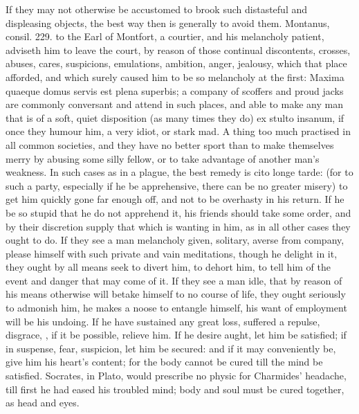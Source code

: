 {If they may not otherwise be accustomed to brook such distasteful and
displeasing objects, the best way then is generally to avoid them.
Montanus, consil. 229. to the Earl of Montfort, a courtier, and his
melancholy patient, adviseth him to leave the court, by reason of those
continual discontents, crosses, abuses, cares, suspicions,
emulations, ambition, anger, jealousy, which that place afforded, and
which surely caused him to be so melancholy at the first: Maxima
quaeque domus servis est plena superbis; a company of scoffers and
proud jacks are commonly conversant and attend in such places, and able
to make any man that is of a soft, quiet disposition (as many times
they do) ex stulto insanum, if once they humour him, a very idiot, or
stark mad. A thing too much practised in all common societies, and they
have no better sport than to make themselves merry by abusing some
silly fellow, or to take advantage of another man's weakness. In such
cases as in a plague, the best remedy is cito longe tarde: (for to such
a party, especially if he be apprehensive, there can be no greater
misery) to get him quickly gone far enough off, and not to be overhasty
in his return. If he be so stupid that he do not apprehend it, his
friends should take some order, and by their discretion supply that
which is wanting in him, as in all other cases they ought to do. If
they see a man melancholy given, solitary, averse from company, please
himself with such private and vain meditations, though he delight in
it, they ought by all means seek to divert him, to dehort him, to tell
him of the event and danger that may come of it. If they see a man
idle, that by reason of his means otherwise will betake himself to no
course of life, they ought seriously to admonish him, he makes a noose
to entangle himself, his want of employment will be his undoing. If he
have sustained any great loss, suffered a repulse, disgrace, \etc{}, if it
be possible, relieve him. If he desire aught, let him be satisfied; if
in suspense, fear, suspicion, let him be secured: and if it may
conveniently be, give him his heart's content; for the body cannot be
cured till the mind be satisfied.  Socrates, in Plato, would
prescribe no physic for Charmides' headache, till first he had eased
his troubled mind; body and soul must be cured together, as head and
eyes.


}
